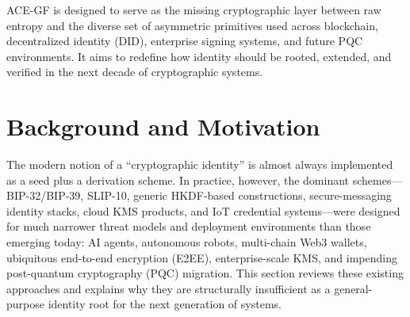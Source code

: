 \documentclass[11pt,a4paper]{article}
\begin{document}
ACE-GF is designed to serve as the missing cryptographic layer between raw entropy and the diverse set of asymmetric primitives used across blockchain, decentralized identity (DID), enterprise signing systems, and future PQC environments. It aims to redefine how identity should be rooted, extended, and verified in the next decade of cryptographic systems.

\section{Background and Motivation}

The modern notion of a ``cryptographic identity'' is almost always implemented as a seed plus a derivation scheme. In practice, however, the dominant schemes---BIP-32/BIP-39, SLIP-10, generic HKDF-based constructions, secure-messaging identity stacks, cloud KMS products, and IoT credential systems---were designed for much narrower threat models and deployment environments than those emerging today: AI agents, autonomous robots, multi-chain Web3 wallets, ubiquitous end-to-end encryption (E2EE), enterprise-scale KMS, and impending post-quantum cryptography (PQC) migration.
This section reviews these existing approaches and explains why they are structurally insufficient as a general-purpose identity root for the next generation of systems.
\end{document}
